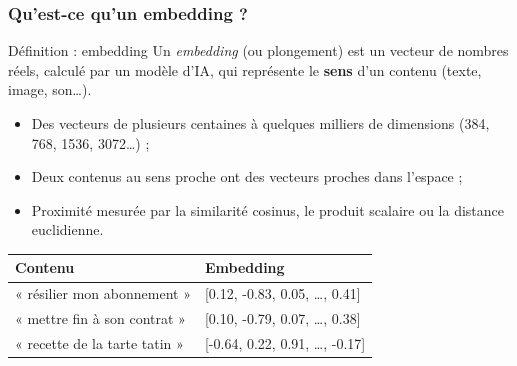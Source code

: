     \begin{frame}
        \frametitle{Qu'est-ce qu'un embedding ?}

        \begin{block}{Définition : embedding}
            Un \textit{embedding} (ou plongement) est un vecteur de nombres réels, calculé par un modèle d'IA, qui représente le \textbf{sens} d'un contenu (texte, image, son\dots).
        \end{block}

        \begin{itemize}
            \small
            \item Des vecteurs de plusieurs centaines à quelques milliers de dimensions (384, 768, 1536, 3072\dots) ;
            \item Deux contenus au sens proche ont des vecteurs proches dans l'espace ;
            \item Proximité mesurée par la similarité cosinus, le produit scalaire ou la distance euclidienne.
        \end{itemize}

        \vspace{5px}
        \footnotesize
        \begin{tabular}{|l|l|}
            \hline
            \textbf{Contenu} & \textbf{Embedding} \\ \hline\hline
            « résilier mon abonnement » & [0.12, -0.83, 0.05, \dots, 0.41] \\ \hline
            « mettre fin à son contrat » & [0.10, -0.79, 0.07, \dots, 0.38] \\ \hline
            « recette de la tarte tatin » & [-0.64, 0.22, 0.91, \dots, -0.17] \\ \hline
        \end{tabular}
    \end{frame}

